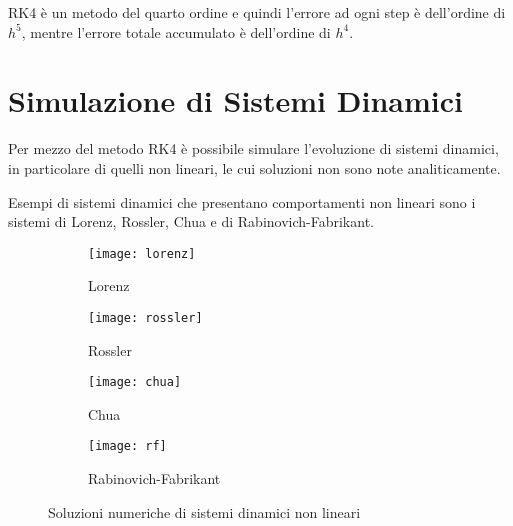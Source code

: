 RK4 è un metodo del quarto ordine e quindi l'errore ad ogni step è dell'ordine di $h^5$, mentre l'errore totale accumulato è dell'ordine di $h^4$.

\section{Simulazione di Sistemi Dinamici}
Per mezzo del metodo RK4 è possibile simulare l'evoluzione di sistemi dinamici, in particolare di quelli non lineari, le cui soluzioni non sono note analiticamente.

Esempi di sistemi dinamici che presentano comportamenti non lineari sono i sistemi di Lorenz, Rossler, Chua e di Rabinovich-Fabrikant.

\begin{figure}[H]
 \begin{subfigure}[b]{0.5\textwidth}
  \centering
  \texttt{[image: lorenz]}
  \caption{Lorenz}
  \label{fig:lorenz}
 \end{subfigure}
 \begin{subfigure}[b]{0.5\textwidth}
  \centering
  \texttt{[image: rossler]}
  \caption{Rossler}
  \label{fig:rossler}
 \end{subfigure}

 \quad
 \begin{subfigure}[b]{0.5\textwidth}
  \centering
  \texttt{[image: chua]}
  \caption{Chua}
  \label{fig:chua}
 \end{subfigure}
 \begin{subfigure}[b]{0.5\textwidth}
  \centering
  \texttt{[image: rf]}
  \caption{Rabinovich-Fabrikant}
  \label{fig:rf}
 \end{subfigure}

 \caption{Soluzioni numeriche di sistemi dinamici non lineari}\label{fig:systems}
\end{figure}

